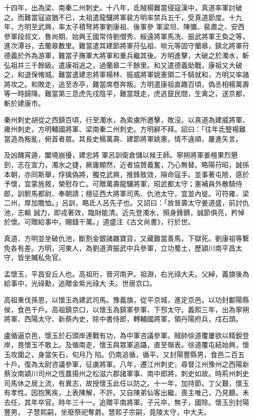 \begin{pinyinscope}
 十四年，出為梁、南秦二州刺史。十八年，氐賊楊難當侵寇漢中，真道率軍討破之。而難當寇盜猶不已，太祖遣龍驤將軍裴方明率禁兵五千，受真道節度。十九年，方明至武興，率太子積弩將軍劉康祖、後軍參
 軍梁坦、陳彌、裴肅之、安西參軍段叔文、魯尚期、始興王國常侍劉僧秀、綏遠將軍馬洗、振武將軍王奐之等，進次潭谷，去蘭皋數里。難當遣其建節將軍苻弘祖、啖元等固守蘭皋，鎮北將軍苻德義於外為游軍，難當子撫軍大將軍和重兵繼其後。方明進擊，大破之於濁水，斬弘祖并三千餘級。遣康祖追之，過蘭皋二千餘里。和又遣德義助戰，康祖又大破之，和退保脩城。難當遣建忠將軍楊林、振威將軍姚憲領二千騎就和，方明又率諸
 將攻之。和敗走，追至赤亭，難當席卷奔叛。方明遣康祖直趣百頃，偽丞相楊萬壽等一時歸降。難當第三息虎先戍陰平，難當既走，虎逃竄民間，生禽之，送京都，斬於建康市。



 秦州刺史胡從之西鎮百頃，行至濁水，為索虜所邀擊，敗沒。以真道為建威將軍、雍州刺史，方明輔國將軍、梁南秦二州刺史。方明辭不拜。詔曰：「往年氐豎楊難當造為叛亂，俯首者眾。其長史楊萬壽、建節將軍姚憲，情不違順，屢進矢言。



 及凶醜宵遁，闔境崩擾，建忠將
 軍呂訓衛倉儲以候王師。寧朔將軍姜檀果烈懇到，志在宣力，濁水之捷，厥庸顯然，近者協贊義奮，乃心無替。略陽苻昭，誠係本朝，亦同斯舉，俘擒偽將，獨克武興，推鋒致效，隕命寇手。並事著屯險，感於予懷，宜蒙旌敘，榮慰存亡。可贈萬壽龍驤將軍，昭武都太守；憲補員外散騎侍郎，訓駙馬都尉、奉朝請；檀征西大將軍司馬、仇池太守，宜並內徙。可符雍、梁二州，厚加贍恤。」呂訓，略氐人呂先子也。又詔曰：「故晉壽太守姜道盛，前討仇池，志輸
 誠力，即戎著效，臨財能清。近先登濁水，殞身鋒鏑，誠節俱亮，矜悼於懷。可贈給事中，賜錢千萬。」道盛注《古文尚書》，行於世。



 真道、方明並坐破仇池，斷割金銀諸雜寶貨，又藏難當善馬，下獄死。劉康祖等繫免各有差。方明，河東人，為劉道濟振武中兵參軍，立功蜀土，歷潁川南平昌太守，皆坐贓私免官。



 孟懷玉，平昌安丘人也。高祖珩，晉河南尹。祖淵，右光祿大夫。父綽，義旗後為給事中，光祿勳，追贈金紫光祿大
 夫。世居京口。



 高祖東伐孫恩，以懷玉為建武司馬。豫義旗，從平京城，進定京邑。以功封鄱陽縣侯，食邑千戶。高祖鎮京口，以懷玉為鎮軍參軍、下邳太守。義熙三年，出為寧朔將軍、西陽太守、新蔡內史，除中書侍郎，轉輔國將軍，領丹陽府兵，戍石頭。



 盧循逼京邑，懷玉於石頭岸連戰有功，為中軍咨議參軍。賊帥徐道覆屢欲以精銳登岸，畏懷玉不敢上。及循南走，懷玉與眾軍追躡，直至嶺表。徐道覆屯結始興，懷玉攻圍之，身當矢石，旬月乃
 陷。仍南追循，循平，又封陽豐縣男，食邑二百五十戶。復為太尉咨議參軍，征虜將軍。八年，遷江州刺史，尋督江州豫州之西陽新蔡汝南潁川司州之恆農揚州之松滋六郡諸軍事、南中郎將，刺史如故。時荊州刺史司馬休之居上流，有異志，故授懷玉此任以防之。十一年，加持節。丁父艱，懷玉有孝性。因抱篤疾，上表陳解，不許。又自陳弟仙客出繼，喪主唯己，乃見聽。未去任，其年卒官。時年三十一。追贈平南將軍。子元卒，無子，國除。懷玉別封陽豐男，
 子慧熙嗣，坐廢祭祀奪爵。慧熙子宗嗣，竟陵太守，中大夫。




\end{pinyinscope}
